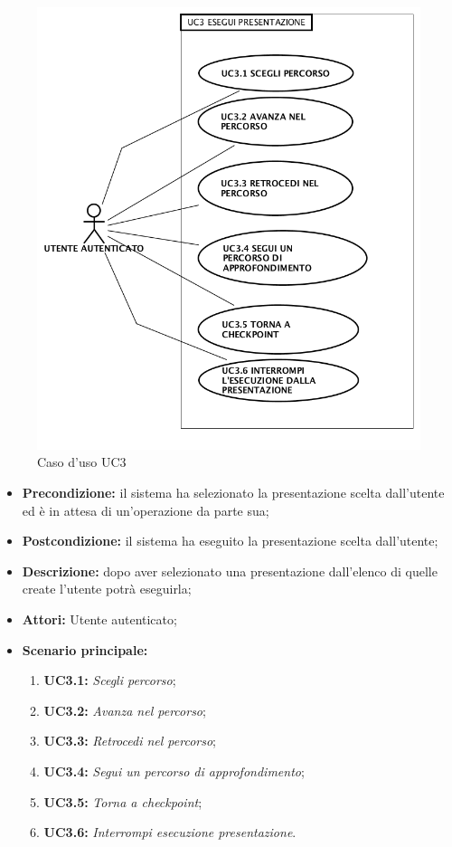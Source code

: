 \begin{figure}[h]
	\begin{center}
	\includegraphics[scale=0.4]{diagram/UC3.png}
	\caption{Caso d'uso UC3}
	\end{center}
\end{figure}
\begin{itemize}
	\item \textbf{Precondizione:} il sistema ha selezionato la presentazione scelta dall'utente ed è in attesa di un’operazione da parte sua;
	\item \textbf{Postcondizione:} il sistema ha eseguito la presentazione scelta dall'utente;
	\item \textbf{Descrizione:} dopo aver selezionato una presentazione dall'elenco di quelle create l'utente potrà eseguirla;
	\item \textbf{Attori:} Utente autenticato;
	\item \textbf{Scenario principale:}
	\begin{enumerate}
		\item \textbf{ UC3.1:} \textit{ Scegli percorso};
		\item \textbf{ UC3.2:} \textit{ Avanza nel percorso};
		\item \textbf{ UC3.3:} \textit{ Retrocedi nel percorso};
		\item \textbf{ UC3.4:} \textit{ Segui un percorso di approfondimento};
		\item \textbf{ UC3.5:} \textit{ Torna a checkpoint};
		\item \textbf{ UC3.6:} \textit{ Interrompi esecuzione presentazione}.
	\end{enumerate}
\end{itemize}
